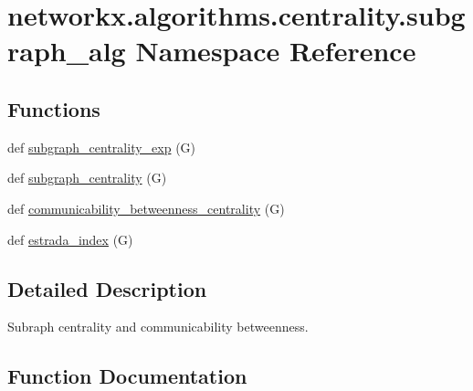 \hypertarget{namespacenetworkx_1_1algorithms_1_1centrality_1_1subgraph__alg}{}\section{networkx.\+algorithms.\+centrality.\+subgraph\+\_\+alg Namespace Reference}
\label{namespacenetworkx_1_1algorithms_1_1centrality_1_1subgraph__alg}
\subsection*{Functions}
\begin{DoxyCompactItemize}
\item 
def \hyperlink{namespacenetworkx_1_1algorithms_1_1centrality_1_1subgraph__alg_af09b3362093a174f361abcce51d556a6}{subgraph\+\_\+centrality\+\_\+exp} (G)
\item 
def \hyperlink{namespacenetworkx_1_1algorithms_1_1centrality_1_1subgraph__alg_a25d1ab7bae1c2fd1078b1f424cc3c8f0}{subgraph\+\_\+centrality} (G)
\item 
def \hyperlink{namespacenetworkx_1_1algorithms_1_1centrality_1_1subgraph__alg_a148bd46adbec3182a0d5c4367eec23ca}{communicability\+\_\+betweenness\+\_\+centrality} (G)
\item 
def \hyperlink{namespacenetworkx_1_1algorithms_1_1centrality_1_1subgraph__alg_a073579bc3ceae86ac3214562d6a4ee6c}{estrada\+\_\+index} (G)
\end{DoxyCompactItemize}


\subsection{Detailed Description}
\begin{DoxyVerb}Subraph centrality and communicability betweenness.
\end{DoxyVerb}
 

\subsection{Function Documentation}
\mbox{\label{namespacenetworkx_1_1algorithms_1_1centrality_1_1subgraph__alg_a148bd46adbec3182a0d5c4367eec23ca}} 

